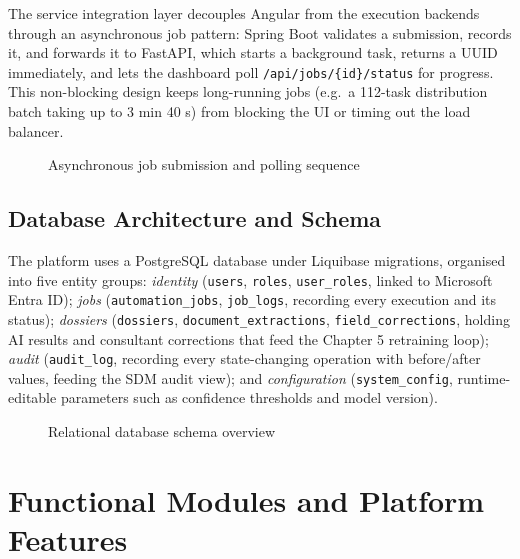 The service integration layer decouples Angular from the execution backends through an asynchronous job pattern: Spring Boot validates a submission, records it, and forwards it to FastAPI, which starts a background task, returns a UUID immediately, and lets the dashboard poll \texttt{/api/jobs/\{id\}/status} for progress. This non-blocking design keeps long-running jobs (e.g.\ a 112-task distribution batch taking up to 3 min 40 s) from blocking the UI or timing out the load balancer.

\begin{figure}[H]
  \centering
  \caption{Asynchronous job submission and polling sequence}
  \label{fig:job-sequence}
\end{figure}

\subsection{Database Architecture and Schema}

The platform uses a PostgreSQL database under Liquibase migrations, organised into five entity groups: \emph{identity} (\texttt{users}, \texttt{roles}, \texttt{user\_roles}, linked to Microsoft Entra ID); \emph{jobs} (\texttt{automation\_jobs}, \texttt{job\_logs}, recording every execution and its status); \emph{dossiers} (\texttt{dossiers}, \texttt{document\_extractions}, \texttt{field\_corrections}, holding AI results and consultant corrections that feed the Chapter 5 retraining loop); \emph{audit} (\texttt{audit\_log}, recording every state-changing operation with before/after values, feeding the SDM audit view); and \emph{configuration} (\texttt{system\_config}, runtime-editable parameters such as confidence thresholds and model version).

\begin{figure}[H]
  \centering
  \caption{Relational database schema overview}
  \label{fig:db-schema}
\end{figure}

\section{Functional Modules and Platform Features}

